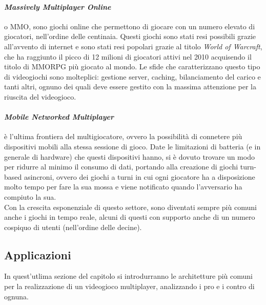         \paragraph{\textit{Massively Multiplayer Online}} o MMO, sono giochi online che permettono di giocare con un numero elevato di giocatori, nell'ordine delle centinaia. Questi
            giochi sono stati resi possibili grazie all'avvento di internet e sono stati resi popolari grazie al titolo \textit{World of Warcraft}, che ha raggiunto il picco di 12 milioni di
            giocatori attivi nel 2010 acquisendo il titolo di MMORPG più giocato al mondo. Le sfide che caratterizzano questo tipo di videogiochi sono molteplici: gestione server, 
            caching, bilanciamento del carico e tanti altri, ognuno dei quali deve essere gestito con la massima attenzione per la riuscita del videogioco.

        \paragraph{\textit{Mobile Networked Multiplayer}} è l'ultima frontiera del multigiocatore, ovvero la possibilità di connetere più dispositivi mobili alla stessa sessione di 
            gioco. Date le limitazioni di batteria (e in generale di hardware) che questi dispositivi hanno, si è dovuto trovare un modo per ridurre al minimo il consumo di dati,
            portando alla creazione di giochi turn-based asincroni, ovvero dei giochi a turni in cui ogni giocatore ha a disposizione molto tempo per fare la sua mossa e viene
            notificato quando l'avversario ha compiuto la sua.\\
            Con la crescita esponenziale di questo settore, sono diventati sempre più comuni anche i giochi in tempo reale, alcuni di questi con supporto anche di un numero cospiquo
            di utenti (nell'ordine delle decine).
        
    \subsection{Applicazioni}\label{subsec:MultiApplicazioni}
        In quest'utlima sezione del capitolo si introdurranno le architetture più comuni per la realizzazione di un videogioco multiplayer, analizzando i pro e i contro di ognuna.
